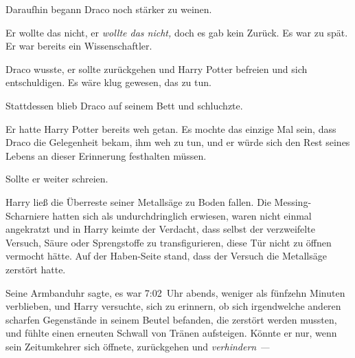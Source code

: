 Daraufhin begann Draco noch stärker zu weinen.

Er wollte das nicht, er \emph{wollte das nicht,} doch es gab kein Zurück. Es war zu spät. Er war bereits ein Wissenschaftler.

Draco wusste, er sollte zurückgehen und Harry Potter befreien und sich entschuldigen. Es wäre klug gewesen, das zu tun.

Stattdessen blieb Draco auf seinem Bett und schluchzte.

Er hatte Harry Potter bereits weh getan. Es mochte das einzige Mal sein, dass Draco die Gelegenheit bekam, ihm weh zu tun, und er würde sich den Rest seines Lebens an dieser Erinnerung festhalten müssen.

Sollte er weiter schreien.

\later

Harry ließ die Überreste seiner Metallsäge zu Boden fallen. Die Messing-Scharniere hatten sich als undurchdringlich erwiesen, waren nicht einmal angekratzt und in Harry keimte der Verdacht, dass selbst der verzweifelte Versuch, Säure oder Sprengstoffe zu transfigurieren, diese Tür nicht zu öffnen vermocht hätte. Auf der Haben-Seite stand, dass der Versuch die Metallsäge zerstört hatte.

Seine Armbanduhr sagte, es war 7:02~Uhr abends, weniger als fünfzehn Minuten verblieben, und Harry versuchte, sich zu erinnern, ob sich irgendwelche anderen scharfen Gegenstände in seinem Beutel befanden, die zerstört werden mussten, und fühlte einen erneuten Schwall von Tränen aufsteigen. Könnte er nur, wenn sein Zeitumkehrer sich öffnete, zurückgehen und \emph{verhindern —}

